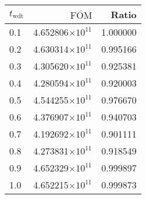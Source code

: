 \begin{tabular}{lrr}
\toprule
$t_{\mathrm{wdt}}$ & $\overline{\mathrm{FOM}}$ &    Ratio \\
\midrule
               0.1 &  4.652806$\times 10^{11}$ & 1.000000 \\
               0.2 &  4.630314$\times 10^{11}$ & 0.995166 \\
               0.3 &  4.305620$\times 10^{11}$ & 0.925381 \\
               0.4 &  4.280594$\times 10^{11}$ & 0.920003 \\
               0.5 &  4.544255$\times 10^{11}$ & 0.976670 \\
               0.6 &  4.376907$\times 10^{11}$ & 0.940703 \\
               0.7 &  4.192692$\times 10^{11}$ & 0.901111 \\
               0.8 &  4.273831$\times 10^{11}$ & 0.918549 \\
               0.9 &  4.652329$\times 10^{11}$ & 0.999897 \\
               1.0 &  4.652215$\times 10^{11}$ & 0.999873 \\
\bottomrule
\end{tabular}
